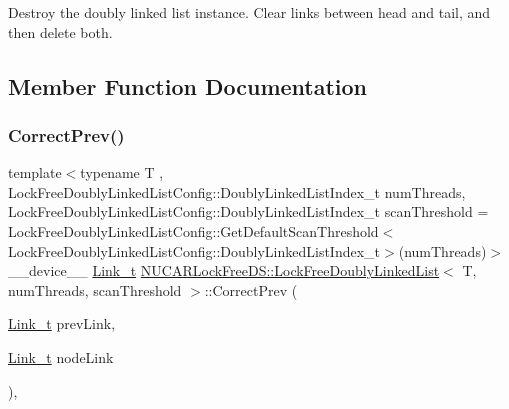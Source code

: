 Destroy the doubly linked list instance. Clear links between head and tail, and then delete both. 

\subsection{Member Function Documentation}
\mbox{\label{class_n_u_c_a_r_lock_free_d_s_1_1_lock_free_doubly_linked_list_ac7ee6264f3403d6ac63b63614cf6d72a}} 
\subsubsection{\texorpdfstring{Correct\+Prev()}{CorrectPrev()}}
{\footnotesize\ttfamily template$<$typename T , Lock\+Free\+Doubly\+Linked\+List\+Config\+::\+Doubly\+Linked\+List\+Index\+\_\+t num\+Threads, Lock\+Free\+Doubly\+Linked\+List\+Config\+::\+Doubly\+Linked\+List\+Index\+\_\+t scan\+Threshold = Lock\+Free\+Doubly\+Linked\+List\+Config\+::\+Get\+Default\+Scan\+Threshold$<$\+Lock\+Free\+Doubly\+Linked\+List\+Config\+::\+Doubly\+Linked\+List\+Index\+\_\+t$>$(num\+Threads)$>$ \\
\+\_\+\+\_\+device\+\_\+\+\_\+ \mbox{\hyperlink{class_n_u_c_a_r_lock_free_d_s_1_1_lock_free_doubly_linked_list_a08f21d5e04bc2a02d6c1d8861a6ba0de}{Link\+\_\+t}} \mbox{\hyperlink{class_n_u_c_a_r_lock_free_d_s_1_1_lock_free_doubly_linked_list}{N\+U\+C\+A\+R\+Lock\+Free\+D\+S\+::\+Lock\+Free\+Doubly\+Linked\+List}}$<$ T, num\+Threads, scan\+Threshold $>$\+::Correct\+Prev (\begin{DoxyParamCaption}\item[{\mbox{\hyperlink{class_n_u_c_a_r_lock_free_d_s_1_1_lock_free_doubly_linked_list_a08f21d5e04bc2a02d6c1d8861a6ba0de}{Link\+\_\+t}}}]{prev\+Link,  }\item[{\mbox{\hyperlink{class_n_u_c_a_r_lock_free_d_s_1_1_lock_free_doubly_linked_list_a08f21d5e04bc2a02d6c1d8861a6ba0de}{Link\+\_\+t}}}]{node\+Link }\end{DoxyParamCaption})\hspace{0.3cm}{\ttfamily [inline]}, {\ttfamily [private]}}

